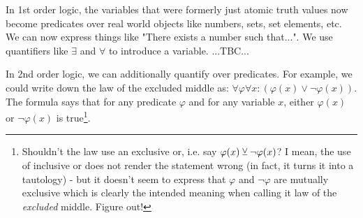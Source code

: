 
\medskip
In 1st order logic, the variables that were formerly just atomic truth values now become predicates over real world objects like numbers, sets, set elements, etc. We can now express things like "There exists a number such that...". We use quantifiers like $\exists$ and $\forall$ to introduce a variable. ...TBC...

\medskip
In 2nd order logic, we can additionally quantify over predicates. For example, we could write down the law of the excluded middle as: $\forall \varphi \forall x: (\varphi(x) \vee \neg \varphi(x))$. The formula says that for any predicate $\varphi$ and for any variable $x$, either $\varphi(x)$ or $\neg \varphi(x)$ is true\footnote{Shouldn't the law use an exclusive or, i.e. say $\varphi(x) \mathbin{\veebar} \neg \varphi(x)$? I mean, the use of inclusive or does not render the statement wrong (in fact, it turns it into a tautology) - but it doesn't seem to express that $\varphi$ and $\neg \varphi$ are mutually exclusive which is clearly the intended meaning when calling it law of the \emph{excluded} middle. Figure out!}.













